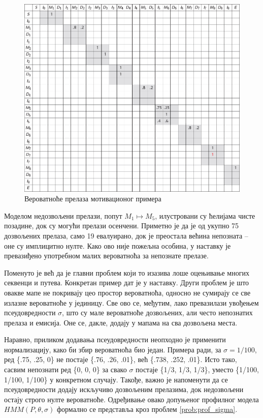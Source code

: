 \documentclass[12pt,oneside]{memoir}
\begin{document}
\begin{CJK}{UTF8}{ipxm}
\begin{figure}[H]
  \centering
  \includegraphics[width=\textwidth]{prelazi.png}
  \caption{Вероватноће прелаза мотивационог примера \cite{compeau2015}}
  \label{fig:prelazi}
\end{figure}

Моделом недозвољени прелази, попут $M_1 \mapsto M_5$, илустровани су ћелијама чисте позадине, док су могући прелази осенчени. Приметно је да је од укупно 75 дозвољених прелаза, само 19 евалуирано, док је преостала већина непозната -- оне су имплицитно нулте. Како ово није пожељна особина, у наставку је превазиђено употребном малих вероватноћа за непознате прелазе.

Поменуто је већ да је главни проблем који то изазива лоше оцењивање многих секвенци и путева. Конкретан пример дат је у наставку. Други проблем је што овакве мапе не покривају цео простор вероватноћа, односно не сумирају се све излазне вероватноће у јединицу. Све ово се, међутим, лако превазилази увођењем псеудовредности $\sigma$, што су мале вероватноће дозвољених, али често непознатих прелаза и емисија. Оне се, дакле, додају у мапама на сва дозвољена места.

Наравно, приликом додавања псеудовредности неопходно је применити нормализацију, како би збир вероватноћа био један. Примера ради, за $\sigma = 1/100$, ред \{.75, .25, 0\} не постаје \{.76, .26, .01\}, већ \{.738, .252, .01\}. Исто тако, сасвим непознати ред \{0, 0, 0\} за свако $\sigma$ постаје \{1/3, 1/3, 1/3\}, уместо \{1/100, 1/100, 1/100\} у конкретном случају. Такође, важно је напоменути да се псеудовредности додају искључиво дозвољеним прелазима, док недозвољени остају строго нулте вероватноће. Одређивање овако допуњеног профилног модела $HMM(P, \theta, \sigma)$ формално се представља кроз проблем \ref{prob:prof_sigma}.


\end{CJK}
\end{document}

